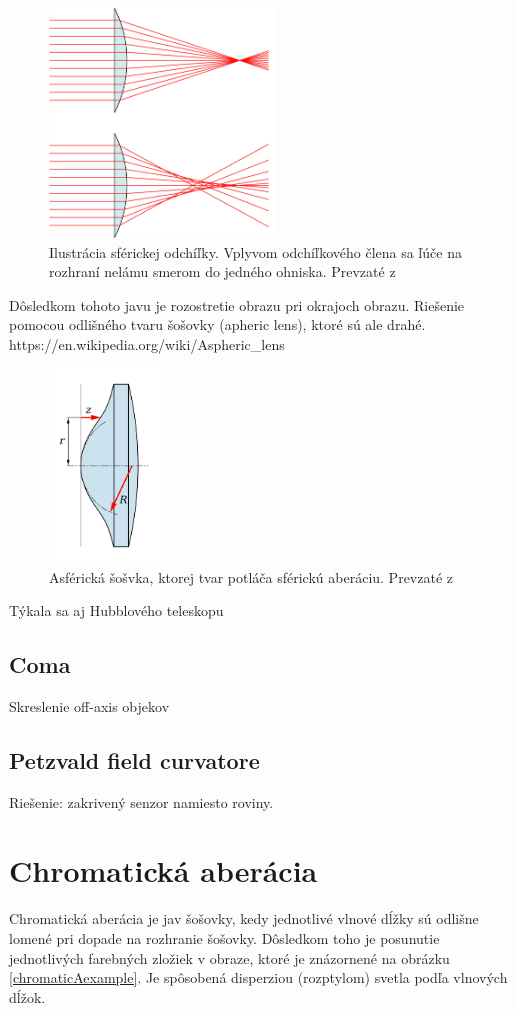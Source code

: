 \begin{figure}[h]
\centering
\label{saill}
\includegraphics[width=6cm]{obrazky-figures/sphericalAberrationWikipedia.png}
\caption{Ilustrácia sférickej odchíľky. Vplyvom odchíľkového člena sa ľúče na rozhraní nelámu smerom
    do jedného ohniska. Prevzaté z }
\end{figure}

Dôsledkom tohoto javu je rozostretie obrazu pri okrajoch obrazu.  
Riešenie pomocou odlišného tvaru šošovky (apheric lens), ktoré sú ale drahé. https://en.wikipedia.org/wiki/Aspheric\_lens

\begin{figure}[h]
\centering
\includegraphics[width=3cm]{obrazky-figures/asphericLen.png}
\caption{Asférická šošvka, ktorej tvar potláča sférickú aberáciu. Prevzaté z }
\end{figure}

Týkala sa aj Hubblového teleskopu
\subsection{Coma}
Skreslenie off-axis objekov
\subsection{Petzvald field curvatore}
Riešenie: zakrivený senzor namiesto roviny.

\section{Chromatická aberácia}
Chromatická aberácia je jav šošovky, kedy jednotlivé vlnové dĺžky sú odlišne lomené pri dopade na
rozhranie šošovky. Dôsledkom toho je posunutie jednotlivých farebných zložiek v obraze, ktoré je
znázornené na obrázku \ref{chromaticAexample}.
Je spôsobená disperziou (rozptylom) svetla podľa vlnových dĺžok.

